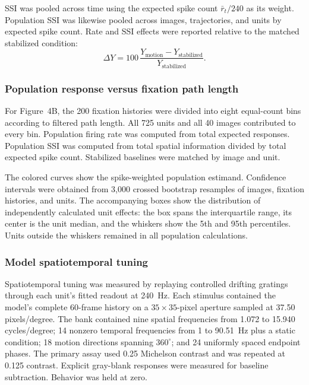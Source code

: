 \documentclass{lite}
\begin{document}
SSI was pooled across time using the expected spike count $\bar r_t/240$ as its weight. Population SSI was likewise pooled across images, trajectories, and units by expected spike count. Rate and SSI effects were reported relative to the matched stabilized condition:
\begin{equation}
\Delta Y = 100\,
\frac{Y_{\mathrm{motion}}-Y_{\mathrm{stabilized}}}
     {Y_{\mathrm{stabilized}}}.
\end{equation}

\subsubsection{Population response versus fixation path length}

For Figure~4B, the 200 fixation histories were divided into eight equal-count bins according to filtered path length. All 725 units and all 40 images contributed to every bin. Population firing rate was computed from total expected responses. Population SSI was computed from total spatial information divided by total expected spike count. Stabilized baselines were matched by image and unit.

The colored curves show the spike-weighted population estimand. Confidence intervals were obtained from 3{,}000 crossed bootstrap resamples of images, fixation histories, and units. The accompanying boxes show the distribution of independently calculated unit effects: the box spans the interquartile range, its center is the unit median, and the whiskers show the 5th and 95th percentiles. Units outside the whiskers remained in all population calculations.

\subsubsection{Model spatiotemporal tuning}

Spatiotemporal tuning was measured by replaying controlled drifting gratings through each unit's fitted readout at 240~Hz. Each stimulus contained the model's complete 60-frame history on a $35\times35$-pixel aperture sampled at 37.50 pixels/degree. The bank contained nine spatial frequencies from 1.072 to 15.940 cycles/degree; 14 nonzero temporal frequencies from 1 to 90.51~Hz plus a static condition; 18 motion directions spanning $360^\circ$; and 24 uniformly spaced endpoint phases. The primary assay used 0.25 Michelson contrast and was repeated at 0.125 contrast. Explicit gray-blank responses were measured for baseline subtraction. Behavior was held at zero.
\end{document}
